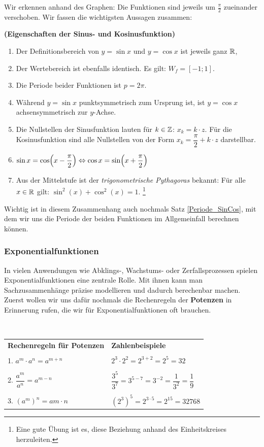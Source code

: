 \documentclass[ngerman, 12pt]{nssheetxea}
\begin{document}
Wir erkennen anhand des Graphen: Die Funktionen sind jeweils um $\frac{\pi}{2}$ zueinander verschoben. Wir fassen die wichtigsten Aussagen zusammen:
\begin{theorem} \textbf{(Eigenschaften der Sinus- und Kosinusfunktion)}
\begin{enumerate}
\item Der Definitionsbereich von $y=\sin x$ und $y=\cos x$ ist jeweils ganz $\mathbb{R}$,
\item Der Wertebereich ist ebenfalls identisch. Es gilt: $W_f = [-1;1]$.
\item Die Periode beider Funktionen ist $p=2\pi$.
\item Während $y=\sin x$ punktsymmetrisch zum Ursprung ist, ist $y=\cos x$ achsensymmetrisch zur $y$-Achse. 
\item Die Nullstellen der Sinusfunktion lauten für $k \in \mathbb{Z}$: $x_k=k \cdot z$. Für die Kosinusfunktion sind alle Nullstellen von der Form $x_k=\dfrac{\pi}{2}+k \cdot z$ darstellbar.
\item $\sin x = \cos \mleft( x-\dfrac{\pi}{2} \mright) \Leftrightarrow \cos x = \sin \mleft( x + \dfrac{\pi}{2}  \mright)$
\item Aus der Mittelstufe ist der \textit{trigonometrische Pythagoras} bekannt: Für alle $x\in \mathbb{R}$ gilt: $\sin^2 (x) + \cos^2 (x) = 1$. \footnote{Eine gute Übung ist es, diese Beziehung anhand des Einheitskreises herzuleiten.}
\end{enumerate}
\end{theorem}
Wichtig ist in diesem Zusammenhang auch nochmals Satz \ref{Periode_SinCos}, mit dem wir uns die Periode der beiden Funktionen im Allgemeinfall berechnen können.

\subsubsection{Exponentialfunktionen}
In vielen Anwendungen wie Abklings-, Wachstums- oder Zerfallsprozessen spielen Exponentialfunktionen eine zentrale Rolle. Mit ihnen kann man Sachzusammenhänge präzise modellieren und dadurch berechenbar machen. Zuerst wollen wir uns dafür nochmals die Rechenregeln der \textbf{Potenzen} in Erinnerung rufen, die wir für Exponentialfunktionen oft brauchen. 

\begin{theorem} \ \par
\begin{tabularx}{\textwidth}{X X}
\setstretch{2}
\textbf{Rechenregeln für Potenzen} & \textbf{Zahlenbeispiele} \\
\\
1.   $a^m\cdot a^n=a^{m+n}$ & $2^3\cdot 2^2=2^{3+2} = 2^5 = 32$ \\
\\
2.   $\dfrac{a^m}{a^n}=a^{m-n}$ & $\dfrac{3^5}{3^7}=3^{5-7}=3^{-2}=\dfrac{1}{3^2}=\dfrac{1}{9}$ \\
\\
3.   $(a^m)^n=a{m\cdot n}$ & $(2^3)^5=2^{3\cdot 5}=2^{15}=32768$
\index{Potenzen}
\end{tabularx}
\end{theorem}
\end{document}

